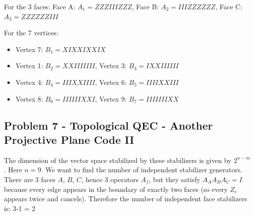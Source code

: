 \begin{center}
\end{center}

For the 3 faces: Face A: $A_1 = ZZZIIIZZZ$, Face B: $A_2 = IIIZZZZZZ$, Face C: $A_3 = ZZZZZZIII$

For the 7 vertices:
\begin{itemize}
    \item Vertex 7: $B_1 = XIXXIXXIX$
    \item Vertex 1: $B_2 = XXIIIIIII$, Vertex 3: $B_3 = IXXIIIIII$
    \item Vertex 4: $B_4 = IIIXXIIII$, Vertex 6: $B_5 = IIIIXXIII$
    \item Vertex 8: $B_6 = IIIIIIXXI$, Vertex 9: $B_7 = IIIIIIIXX$
\end{itemize}



\newpage
\subsection{Problem 7 - Topological QEC - Another Projective Plane Code II}
The dimension of the vector space stabilized by these stabilizers is given by $2^{n-m}$. Here $n = 9$. We want to find the number of independent stabilizer generators. \\

There are 3 faces $A$, $B$, $C$, hence 3 operators $A_f$, but they satisfy $A_AA_BA_C = I$ because every edge appears in the boundary of exactly two faces (so every $Z_e$ appears twice and cancels). Therefore the number of independent face stabilizers is: 3-1 = 2 \\

